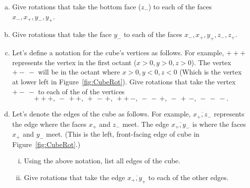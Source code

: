 \begin{exercise}\label{exercise:actions:Cube1}
\begin{enumerate}[(a)]
\item Give rotations that take the bottom face ($z_-$) to each of the faces $x_-,x_+,y_-,y_+$.
\item Give rotations that take the face $y_- $ to each of the faces $x_-,x_+,y_+,z_-,z_+$.
\item Let's define a notation for the cube's vertices as follows.  For example, $+++$ represents the vertex in the first octant ($x>0,y>0,z>0$).  The vertex $+-\,-$ will be in the octant where $x>0,y<0,z<0$ (Which is the vertex at lower left in Figure~\ref{fig:CubeRot}).  Give rotations that take the vertex $+-\,-$ to each of the of the vertices 
\[ +++, ~-\,++,~+\,-\,+,~ ++\,-,~-\,-\,+,~-\,+\,-,~-\,-\,-. \]

\item Let's denote the edges of the cube as follows.  For example, $\overline{x_+,z_-}$ represents the edge where the faces $x_+$ and $z_-$ meet.  The edge $\overline{x_+,y_-}$ is where the faces $x_+$ and $y_-$ meet.  (This is the left, front-facing edge of cube in Figure~\ref{fig:CubeRot}.)  
\begin{enumerate}[(i)]
\item Using the above notation, list all edges of the cube.
\item Give rotations that take the edge $\overline{x_+,y_+}$ to each of the other edges. 
\end{enumerate}
\end{enumerate}
\end{exercise} 
